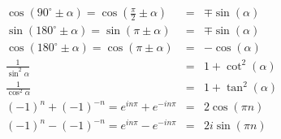 \begin{align*}
     & \cos(90^\circ\pm\alpha) = \cos(\frac{\pi}{2} \pm \alpha)                                    & = & \mp\sin(\alpha)                                            \\
     & \sin(180^\circ\pm\alpha) = \sin(\pi \pm \alpha)                                             & = & \mp\sin(\alpha)                                            \\
     & \cos(180^\circ\pm\alpha) = \cos(\pi \pm \alpha)                                             & = & -\cos(\alpha)                                              \\
     & \frac{1}{\sin^2 \alpha}                                                                     & = & 1+\cot^2 (\alpha)                                          \\
     & \frac{1}{\cos^2 \alpha}                                                                     & = & 1+\tan^2 (\alpha)                                          \\
     & {(-1)}^n+{(-1)}^{-n}=e^{in\pi}+e^{-in\pi}                                                   & = & 2\cos(\pi n)                                               \\
     & {(-1)}^n-{(-1)}^{-n}=e^{in\pi}-e^{-in\pi}                                                   & = & 2i\sin(\pi n)
\end{align*}

